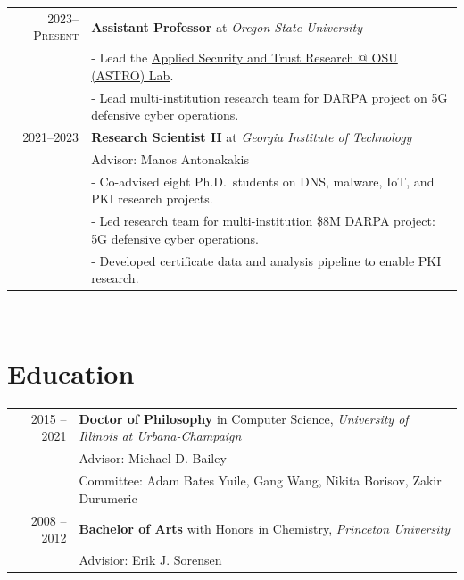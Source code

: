 \documentclass[10pt,singlecolumn]{article} %
\begin{document}
\begin{tabular}{rl}

2023--\textsc{Present} & \textbf{Assistant Professor} at \emph{Oregon State University}\\ 
	& - Lead the \href{https://astrolab.site}{Applied Security and Trust Research @ OSU (ASTRO) Lab}. \\
	& - Lead multi-institution research team for DARPA project on 5G defensive cyber operations.\\

2021--\textsc{2023} & \textbf{Research Scientist II} at \emph{Georgia Institute of Technology}\\ 
& Advisor: Manos Antonakakis \\
& - Co-advised eight Ph.D.\ students on DNS, malware, IoT, and PKI research projects. \\
& - Led research team for multi-institution \$8M DARPA project: 5G defensive cyber operations. \\
& - Developed certificate data and analysis pipeline to enable PKI research. \\
\end{tabular}\\




\section{Education} 

\begin{tabular}{rl} %


2015 -- 2021 & \textbf{Doctor of Philosophy} in Computer Science, \emph{University of Illinois at Urbana-Champaign}\\ 
& Advisor: Michael D. Bailey \\
& Committee: Adam Bates Yuile, Gang Wang, Nikita Borisov, Zakir Durumeric \\
	 

2008 -- 2012 & \textbf{Bachelor of Arts} with Honors in Chemistry,  \emph{Princeton University}\\
& Advisior: Erik J. Sorensen \\
	  
\end{tabular} \\
\end{document}
